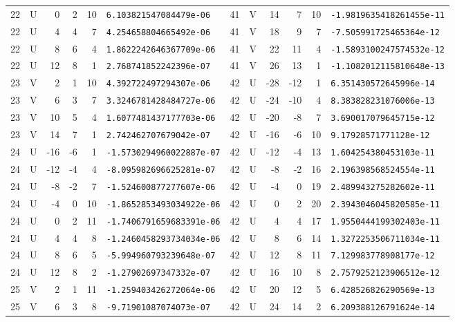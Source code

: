 \begin{longtable}{rcrrrl|rcrrrl}
22 & U & 0 & 2 & 10 & \texttt{6.103821547084479e-06} & 41 & V & 14 & 7 & 10 & \texttt{-1.9819635418261455e-11}\\
22 & U & 4 & 4 & 7 & \texttt{4.254658804665492e-06} & 41 & V & 18 & 9 & 7 & \texttt{-7.505991725465364e-12}\\
22 & U & 8 & 6 & 4 & \texttt{1.8622242646367709e-06} & 41 & V & 22 & 11 & 4 & \texttt{-1.5893100247574532e-12}\\
22 & U & 12 & 8 & 1 & \texttt{2.768741852242396e-07} & 41 & V & 26 & 13 & 1 & \texttt{-1.1082012115810648e-13}\\
23 & V & 2 & 1 & 10 & \texttt{4.392722497294307e-06} & 42 & U & -28 & -12 & 1 & \texttt{6.351430572645996e-14}\\
23 & V & 6 & 3 & 7 & \texttt{3.3246781428484727e-06} & 42 & U & -24 & -10 & 4 & \texttt{8.383828231076006e-13}\\
23 & V & 10 & 5 & 4 & \texttt{1.6077481437177703e-06} & 42 & U & -20 & -8 & 7 & \texttt{3.690017079645715e-12}\\
23 & V & 14 & 7 & 1 & \texttt{2.742462707679042e-07} & 42 & U & -16 & -6 & 10 & \texttt{9.17928571771128e-12}\\
24 & U & -16 & -6 & 1 & \texttt{-1.5730294960022887e-07} & 42 & U & -12 & -4 & 13 & \texttt{1.604254380453103e-11}\\
24 & U & -12 & -4 & 4 & \texttt{-8.095982696625281e-07} & 42 & U & -8 & -2 & 16 & \texttt{2.196398568524554e-11}\\
24 & U & -8 & -2 & 7 & \texttt{-1.524600877277607e-06} & 42 & U & -4 & 0 & 19 & \texttt{2.489943275282602e-11}\\
24 & U & -4 & 0 & 10 & \texttt{-1.8652853493034922e-06} & 42 & U & 0 & 2 & 20 & \texttt{2.3943046045820585e-11}\\
24 & U & 0 & 2 & 11 & \texttt{-1.7406791659683391e-06} & 42 & U & 4 & 4 & 17 & \texttt{1.9550444199302403e-11}\\
24 & U & 4 & 4 & 8 & \texttt{-1.2460458293734034e-06} & 42 & U & 8 & 6 & 14 & \texttt{1.3272253506711034e-11}\\
24 & U & 8 & 6 & 5 & \texttt{-5.994960793239648e-07} & 42 & U & 12 & 8 & 11 & \texttt{7.129983778908177e-12}\\
24 & U & 12 & 8 & 2 & \texttt{-1.27902697347332e-07} & 42 & U & 16 & 10 & 8 & \texttt{2.7579252123906512e-12}\\
25 & V & 2 & 1 & 11 & \texttt{-1.259403426272064e-06} & 42 & U & 20 & 12 & 5 & \texttt{6.428526826290569e-13}\\
25 & V & 6 & 3 & 8 & \texttt{-9.71901087074073e-07} & 42 & U & 24 & 14 & 2 & \texttt{6.209388126791624e-14}\\

\end{longtable}
